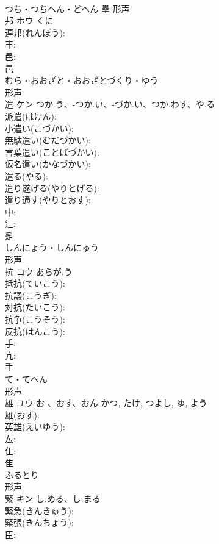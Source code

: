 \documentclass[8pt]{extreport}
\begin{document}
\begin{CJK}{UTF8}{min}
\\	つち・つちへん・どへん	壘	形声 
\\	邦	ホウ	くに		
\\	連邦(れんぽう): 
\\	丰: 
\\	邑: 
\\	邑	
\\	むら・おおざと・おおざとづくり・ゆう	
\\	形声 
\\	遣	ケン	つか.う、-つか.い、-づか.い、つか.わす、や.る		
\\	派遣(はけん): 
\\	小遣い(こづかい): 
\\	無駄遣い(むだづかい): 
\\	言葉遣い(ことばづかい): 
\\	仮名遣い(かなづかい): 
\\	遣る(やる): 
\\	遣り遂げる(やりとげる): 
\\	遣り通す(やりとおす): 
\\	中: 
\\	辶: 
\\	辵	
\\	しんにょう・しんにゅう	
\\	形声 
\\	抗	コウ	あらが.う		
\\	抵抗(ていこう): 
\\	抗議(こうぎ): 
\\	対抗(たいこう): 
\\	抗争(こうそう): 
\\	反抗(はんこう): 
\\	手: 
\\	亢: 
\\	手	
\\	て・てへん	
\\	形声 
\\	雄	ユウ	お-、おす、おん	かつ, たけ, つよし, ゆ, よう	
\\	雄(おす): 
\\	英雄(えいゆう): 
\\	厷: 
\\	隹: 
\\	隹	
\\	ふるとり	
\\	形声 
\\	緊	キン	し.める、し.まる		
\\	緊急(きんきゅう): 
\\	緊張(きんちょう): 
\\	臣: 

\end{CJK}
\end{document}
